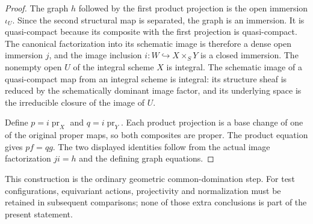 \begin{proof}
The graph $h$ followed by the first product projection is the
open immersion $\iota_U$. Since the second structural map is
separated, the graph is an immersion. It is quasi-compact
because its composite with the first projection is
quasi-compact. The canonical factorization into its schematic
image is therefore a dense open immersion $j$, and the image
inclusion $i:W\hookrightarrow X\times_SY$ is a closed immersion.
The nonempty open $U$ of the integral scheme $X$ is integral.
The schematic image of a quasi-compact map from an integral
scheme is integral: its structure sheaf is reduced by the
schematically dominant image factor, and its underlying space
is the irreducible closure of the image of $U$.

Define $p=i\operatorname{pr}_X$ and
$q=i\operatorname{pr}_Y$. Each product projection is a base
change of one of the original proper maps, so both composites
are proper. The product equation gives $pf=qg$. The two
displayed identities follow from the actual image factorization
$ji=h$ and the defining graph equations.

\end{proof}

This construction is the ordinary geometric common-domination
step. For test configurations, equivariant actions, projectivity
and normalization must be retained in subsequent comparisons;
none of those extra conclusions is part of the present statement.
